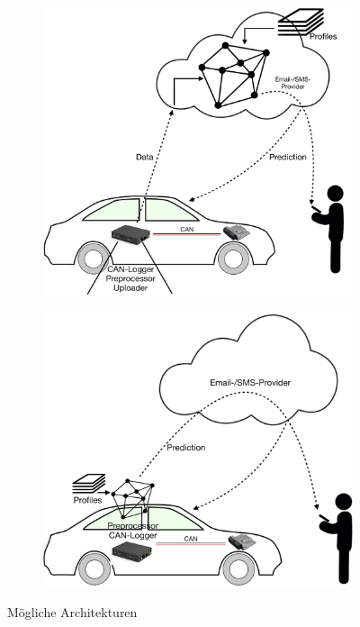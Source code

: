 \begin{figure}
    \centering
    \begin{subfigure}[c]{0.48\textwidth}
        \centering
        \includegraphics[width=\textwidth]{images/arch_type1.png}
        \label{fig:arch1}
    \end{subfigure}
    \hfill
    \begin{subfigure}[c]{0.48\textwidth}
        \centering
        \includegraphics[width=\textwidth]{images/arch_type2.png}
        \label{fig:arch2}
    \end{subfigure}
    \caption{Mögliche Architekturen}
\end{figure}

